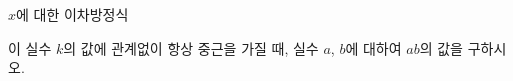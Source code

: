 $x$에 대한 이차방정식 \par\smallskip{}\par\smallskip\noindent 이 실수 $k$의 값에 관계없이 항상 중근을 가질 때, 실수 $a$, $b$에 대하여 $ab$의 값을 구하시오.
